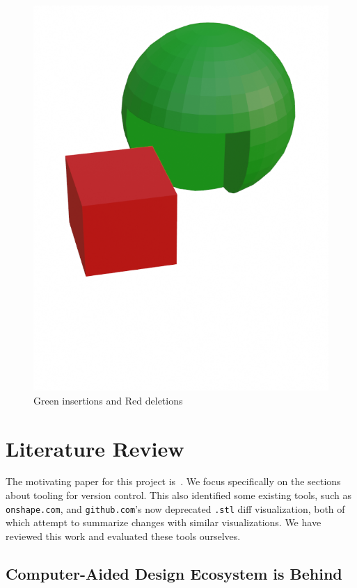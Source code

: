 \documentclass[sigconf,authorversion,nonacm]{acmart}
\begin{document}
\begin{figure}[h]
	\includegraphics[width=0.5\linewidth]{cube-additions-deletions.png}
	\caption{Green insertions and Red deletions}
	\label{fig:booldiff}
\end{figure}


\section{Literature Review}

The motivating paper for this project is~\citet{cheng2023age}.
We focus specifically on the sections about tooling for version control.
This also identified some existing tools, such as \texttt{onshape.com}, and \texttt{github.com}'s now deprecated \texttt{.stl} diff visualization, both of which attempt to summarize changes with similar visualizations.
We have reviewed this work and evaluated these tools ourselves.

\subsection{Computer-Aided Design Ecosystem is Behind}
\end{document}
